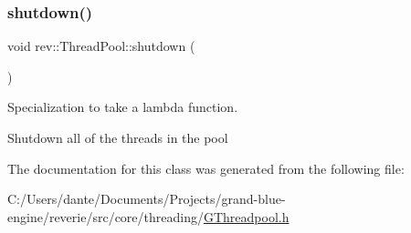 \subsubsection{\texorpdfstring{shutdown()}{shutdown()}}
{\footnotesize\ttfamily void rev\+::\+Thread\+Pool\+::shutdown (\begin{DoxyParamCaption}{ }\end{DoxyParamCaption})\hspace{0.3cm}{\ttfamily [inline]}}



Specialization to take a lambda function. 

Shutdown all of the threads in the pool 

The documentation for this class was generated from the following file\+:\begin{DoxyCompactItemize}
\item 
C\+:/\+Users/dante/\+Documents/\+Projects/grand-\/blue-\/engine/reverie/src/core/threading/\mbox{\hyperlink{_g_threadpool_8h}{G\+Threadpool.\+h}}\end{DoxyCompactItemize}
